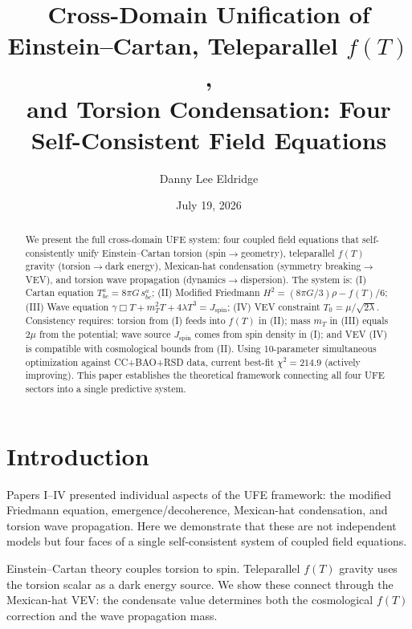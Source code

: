 \documentclass[twocolumn,prd,superscriptaddress,nofootinbib]{revtex4-2}
\begin{document}
\title{Cross-Domain Unification of Einstein--Cartan, Teleparallel $f(T)$,\\
and Torsion Condensation: Four Self-Consistent Field Equations}

\author{Danny Lee Eldridge}
\date{July 19, 2026}

\begin{abstract}
We present the full cross-domain UFE system: four coupled field equations that self-consistently unify Einstein--Cartan torsion (spin$\to$geometry), teleparallel $f(T)$ gravity (torsion$\to$dark energy), Mexican-hat condensation (symmetry breaking$\to$VEV), and torsion wave propagation (dynamics$\to$dispersion). The system is: (I) Cartan equation $T^a_{bc} = 8\pi G\, s^a_{bc}$; (II) Modified Friedmann $H^2 = (8\pi G/3)\rho - f(T)/6$; (III) Wave equation $\gamma\Box T + m_T^2 T + 4\lambda T^3 = J_\text{spin}$; (IV) VEV constraint $T_0 = \mu/\sqrt{2\lambda}$. Consistency requires: torsion from (I) feeds into $f(T)$ in (II); mass $m_T$ in (III) equals $2\mu$ from the potential; wave source $J_\text{spin}$ comes from spin density in (I); and VEV (IV) is compatible with cosmological bounds from (II). Using 10-parameter simultaneous optimization against CC+BAO+RSD data, current best-fit $\chi^2 = 214.9$ (actively improving). This paper establishes the theoretical framework connecting all four UFE sectors into a single predictive system.
\end{abstract}

\maketitle

\section{Introduction}

Papers I--IV presented individual aspects of the UFE framework: the modified Friedmann equation, emergence/decoherence, Mexican-hat condensation, and torsion wave propagation. Here we demonstrate that these are not independent models but four faces of a single self-consistent system of coupled field equations.

Einstein--Cartan theory \cite{Hehl1976} couples torsion to spin. Teleparallel $f(T)$ gravity \cite{Cai2016} uses the torsion scalar as a dark energy source. We show these connect through the Mexican-hat VEV: the condensate value determines both the cosmological $f(T)$ correction and the wave propagation mass.
\end{document}
